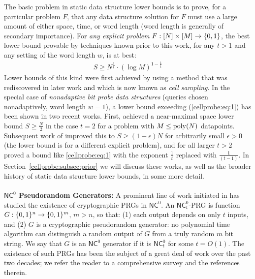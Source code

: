 The basic problem in static data structure lower bounds is to prove, for a particular problem $F$, that any data structure solution for $F$ must use a large amount of either space, time, or word length (word length is generally of secondary importance). 
For \emph{any explicit problem} $F: [N] \times [M] \to \{0,1\}$, the best lower bound provable by techniques known prior to this work, for any $t>1$ and any setting of the word length $w$, is at best:
\begin{gather}
  S \geq N^{\frac{1}{t}} \cdot (\log M)^{1 - \frac{1}{t}}   \label{cellprobe:eq:1}
\end{gather}
Lower bounds of this kind were first achieved by \cite{Siegel89} using a method that was rediscovered in later work and which is now known as \emph{cell sampling}.
In the special case of \emph{nonadaptive bit probe data structures} (queries chosen nonadaptively, word length $w=1$), a lower bound exceeding (\ref{cellprobe:eq:1}) has been shown in two recent works. First, \cite{viola-maximal} achieved a near-maximal space lower bound $S \geq \frac{N}{2}$ in the case $t=2$ for a problem with $M \leq \mathrm{poly}(N)$ datapoints. Subsequent work of \cite{golovnev} improved this to $S \geq (1-\epsilon)N$ for arbitrarily small $\epsilon>0$ (the lower bound is for a different explicit problem), and for all larger $t>2$ proved a bound like \ref{cellprobe:eq:1} with the exponent $\frac{1}{t}$ replaced with $\frac{1}{(t-1)}$. In Section~\ref{cellprobe:subsec:prior} we will discuss these works, as well as the broader history of static data structure lower bounds, in some more detail.
~\\~\\
{\bf \noindent $\mathsf{NC}^0$ Pseudorandom Generators:} 
A prominent line of work initiated in \cite{goldreich-prg,cryan-miltersen}
has studied the existence of cryptographic PRGs in $\mathsf{NC}^0$. An $\mathsf{NC}^0_t$-PRG is function $G: \{0,1\}^n \to \{0,1\}^m$, $m > n$, so that: (1) each output depends on only $t$ inputs, and (2) $G$ is a cryptographic pseudorandom generator: no polynomial time algorithm can distinguish a random output of $G$ from a truly random $m$ bit string.
We say that $G$ is an $\mathsf{NC}^0$ generator if it is $\mathsf{NC}^0_t$ for some $t = O(1)$. 
The existence of such PRGs has been the subject of a great deal of work over the past two decades; we refer the reader to a comprehensive survey \cite{apple-survey} and the references therein. 

